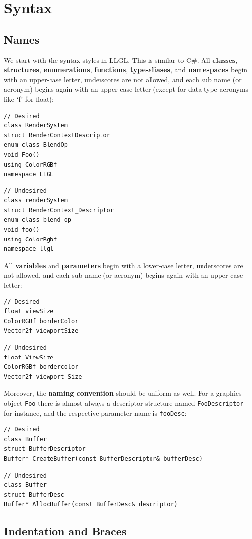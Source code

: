 \documentclass{article}
\begin{document}
\newpage
\section*{Syntax}

\subsection*{Names}

We start with the syntax styles in LLGL. This is similar to C\#.
All \textbf{classes}, \textbf{structures}, \textbf{enumerations}, \textbf{functions}, \textbf{type-aliases},
and \textbf{namespaces} begin with an upper-case letter, underscores are not allowed,
and each sub name (or acronym) begins again with an upper-case letter (except for data type acronyms like `f' for float):
\begin{lstlisting}
// Desired
class RenderSystem
struct RenderContextDescriptor
enum class BlendOp
void Foo()
using ColorRGBf
namespace LLGL
\end{lstlisting}
\begin{lstlisting}
// Undesired
class renderSystem
struct RenderContext_Descriptor
enum class blend_op
void foo()
using ColorRgbf
namespace llgl
\end{lstlisting}
All \textbf{variables} and \textbf{parameters} begin with a lower-case letter, underscores are not allowed,
and each sub name (or acronym) begins again with an upper-case letter:
\begin{lstlisting}
// Desired
float viewSize
ColorRGBf borderColor
Vector2f viewportSize
\end{lstlisting}
\begin{lstlisting}
// Undesired
float ViewSize
ColorRGBf bordercolor
Vector2f viewport_Size
\end{lstlisting}
Moreover, the \textbf{naming convention} should be uniform as well. For a graphics object \texttt{Foo}
there is almost always a descriptor structure named \texttt{FooDescriptor} for instance,
and the respective parameter name is \texttt{fooDesc}:
\begin{lstlisting}
// Desired
class Buffer
struct BufferDescriptor
Buffer* CreateBuffer(const BufferDescriptor& bufferDesc)
\end{lstlisting}
\begin{lstlisting}
// Undesired
class Buffer
struct BufferDesc
Buffer* AllocBuffer(const BufferDesc& descriptor)
\end{lstlisting}

\subsection*{Indentation and Braces}
\end{document}
